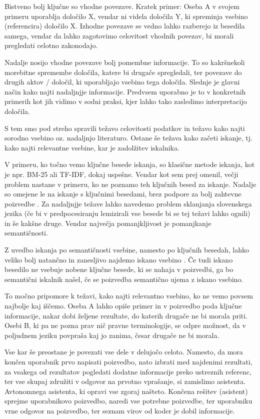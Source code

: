 \documentclass[a4paper,12pt,openright]{book}
\begin{document}
Bistveno bolj ključne so vhodne povezave. Kratek primer: Oseba A v svojem primeru uporablja določilo X, vendar ni videla določila Y, ki spreminja vsebino (referencira) določilo X. Izhodne povezave se vedno lahko razberejo iz besedila samega, vendar da lahko zagotovimo celovitost vhodnih povezav, bi morali pregledati celotno zakonodajo.

Nadalje nosijo vhodne povezave bolj pomembne informacije. To so kakršnekoli morebitne spremembe določila, katere bi drugače spregledali, ter povezave do drugih aktov / določil, ki uporabljajo vsebino tega določila. Slednje je glavni način kako najti nadaljnjje informacije. Predvsem uporabno je to v konkretnih primerih kot jih vidimo v sodni praksi, kjer lahko tako zasledimo interpretacijo določila.

S tem smo pod streho spravili težavo celovitosti podatkov in težavo kako najti sorodno vsebino oz. nadaljnjo literaturo. Ostane še težava kako začeti iskanje, tj. kako najti relevantne vsebine, kar je zadolžitev iskalnika.

V primeru, ko točno vemo ključne besede iskanja, so klasične metode iskanja, kot je npr. BM-25 ali TF-IDF, dokaj uspešne. Vendar kot sem prej omenil, večji problem nastane v primeru, ko ne poznamo teh ključnih besed za iskanje. Nadalje so omejene le na iskanje s ključnimi besedami, brez podpore za bolj zahtevne poizvedbe \cite{bm25_limitations}. Za nadaljnjje težave lahko navedemo problem sklanjanja slovenskega jezika (če bi v predpocesiranju lemizirali vse besede bi se tej težavi lahko ognili) in še kakšne druge. Vendar največja pomanjkljivost je pomanjkanje semantičnosti.

Z uvedbo iskanja po semantičnosti vsebine, namesto po ključnih besedah, lahko veliko bolj natančno in zanesljivo najdemo iskano vsebino \cite{bm25_limitations}. Če tudi iskano besedilo ne vsebuje nobene ključne besede, ki se nahaja v poizvedbi, ga bo semantični iskalnik našel, če se poizvedba semantično ujema z iskano vsebino.

To močno pripomore k težavi, kako najti relevantno vsebino, ko ne vemo povsem najbolje kaj iščemo. Oseba A lahko opiše primer in v poizvedbo poda ključne informacije, nakar dobi željene rezultate, do katerih drugače ne bi morala priti. Osebi B, ki pa ne pozna prav nič pravne terminologije, se odpre možnost, da v poljudnem jeziku povpraša kaj jo zanima, česar drugače ne bi morala.

Vse kar še preostane je povezati vse dele v delujočo celoto. Namesto, da mora končen uporabnik prvo napisati poizvedbo, nato izbrati med najdenimi rezultati, za vsakega od rezultatov pogledati dodatne informacije preko ustreznih referenc, ter vse skupaj združiti v odgovor na prvotno vprašanje, si zamislimo asistenta. Avtonomnega asistenta, ki opravi vse zgoraj našteto. Končena rešitev (asistent) sprejme uporabnikovo poizvedbo, naredi vse potrebne poizvedbe, ter uporabniku vrne odgovor na poizvedbo, ter seznam virov od koder je dobil informacije.
\end{document}

